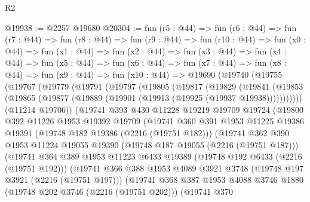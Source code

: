 \begin{lexlean}{R2}
\begin{coremodule}
@19938 := @2257 @19680
@20304 := fun (r5 : @44) =>
  fun (r6 : @44) =>
  fun (r7 : @44) =>
  fun (r8 : @44) =>
  fun (r9 : @44) =>
  fun (r10 : @44) =>
  fun (x0 : @44) =>
  fun (x1 : @44) =>
  fun (x2 : @44) =>
  fun (x3 : @44) =>
  fun (x4 : @44) =>
  fun (x5 : @44) =>
  fun (x6 : @44) =>
  fun (x7 : @44) =>
  fun (x8 : @44) =>
  fun (x9 : @44) =>
  fun (x10 : @44) =>
  @19690
    (@19740
      (@19755
        (@19767
          (@19779
            (@19791
              (@19797
                (@19805
                  (@19817
                    (@19829
                      (@19841
                        (@19853
                          (@19865 (@19877 (@19889 (@19901 (@19913 (@19925 (@19937 @19938)))))))))))
                  (@11214 @19706))
                (@19741
                  @393
                  @430
                  @11228
                  @19219
                  @19709
                  @19724
                  (@19800
                    @392
                    @11226
                    @1953
                    @19392
                    @19709
                    (@19741
                      @360
                      @391
                      @1953
                      @11225
                      @19386
                      @19391
                      (@19748 @182 @19386 (@2216 (@19751 @182)))
                      (@19741
                        @362
                        @390
                        @1953
                        @11224
                        @19055
                        @19390
                        (@19748 @187 @19055 (@2216 (@19751 @187)))
                        (@19741
                          @364
                          @389
                          @1953
                          @11223
                          @6433
                          @19389
                          (@19748 @192 @6433 (@2216 (@19751 @192)))
                          (@19741
                            @366
                            @388
                            @1953
                            @4089
                            @3921
                            @3748
                            (@19748 @197 @3921 (@2216 (@19751 @197)))
                            (@19741
                              @368
                              @387
                              @1953
                              @4088
                              @3746
                              @1880
                              (@19748 @202 @3746 (@2216 (@19751 @202)))
                              (@19741
                                @370

\end{coremodule}
\end{lexlean}
